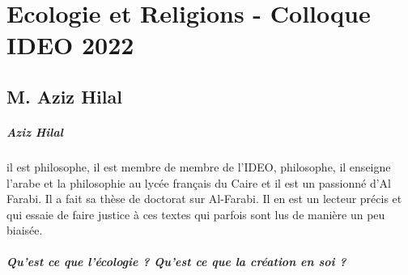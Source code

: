 \chapter{Ecologie et Religions - Colloque IDEO 2022 }

\section{M. Aziz Hilal}

\paragraph{Aziz Hilal} il est philosophe, il est membre de membre de l'IDEO, philosophe, il enseigne l'arabe et la philosophie au lycée français du Caire et il est un passionné d'Al Farabi. Il a fait sa thèse de doctorat sur Al-Farabi. Il en est un lecteur précis et qui essaie de faire justice à ces textes qui parfois sont lus de manière un peu biaisée.

\paragraph{Qu'est ce que l'écologie ? Qu'est ce que la création en soi ?}

